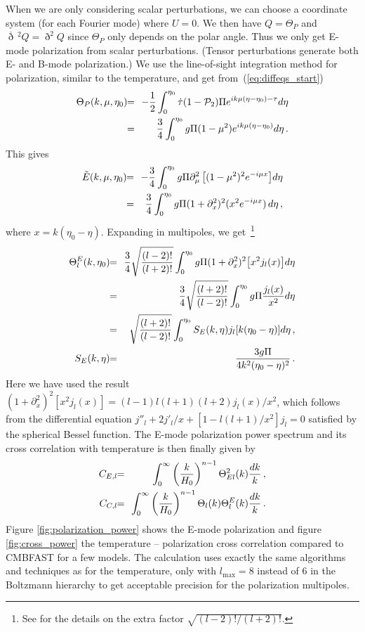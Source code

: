 \documentclass[twocolumn,nofootinbib,amsmath,amssymb]{revtex4}
\newcommand{\ba}{\begin{eqnarray}}
\newcommand{\ea}{\end{eqnarray}}
\newcommand{\hs}{\hspace{-1.12mm}}
\newcommand{\eq}{\hs & = & \hs}
\begin{document}
When we are only considering scalar perturbations, we can choose a coordinate
system (for each Fourier mode) where $U = 0$. We then have $Q = \Theta_P$ and
$\overline{\eth} {}^{\:\! 2} Q = \eth^2 Q$ since $\Theta_P$ only depends on the
polar angle. Thus we only get E-mode polarization from scalar perturbations.
(Tensor perturbations generate both E- and B-mode polarization.) We use the
line-of-sight integration method for polarization, similar to the temperature,
and get from~(\ref{eq:diffeqs_start})
\ba
  \Theta_P(k,\mu,\eta_0) \eq -\frac{1}{2} \int_0^{\eta_0} \dot{\tau}
    (1 - {\cal P}_2) \Pi e^{ik\mu(\eta-\eta_0) - \tau} d\eta \nonumber \\
  \eq \frac{3}{4} \int_0^{\eta_0} g \Pi (1-\mu^2)
    e^{ik\mu(\eta-\eta_0)} d\eta \, .
\ea
This gives~\cite{Zald_Seljak}
\ba
  \tilde{E}(k,\mu,\eta_0) \eq -\frac{3}{4} \int_0^{\eta_0} g \Pi
    \partial_\mu^2 \left[ (1-\mu^2)^2 e^{-i\mu x} \right] \!d\eta \nonumber \\
  \eq \frac{3}{4} \int_0^{\eta_0} g \Pi
    (1 + \partial_x^2)^2 (x^2 e^{-i\mu x}) \, d\eta \, ,
\ea
where $x = k(\eta_0 - \eta)$. Expanding in multipoles, we get~\footnote{See
\cite{Zald_Seljak} for the details on the extra factor $\sqrt{(l-2)! /
(l+2)!}$.}
\ba
  \Theta^E_l(k,\eta_0) \eq \frac{3}{4} \sqrt{\frac{(l-2)!}{(l+2)!}}
    \int_0^{\eta_0} g \Pi (1 + \partial_x^2)^2
    \!\left[ x^2 j_l(x) \right]\! d\eta \nonumber \\
  \eq \frac{3}{4} \sqrt{\frac{(l+2)!}{(l-2)!}} \int_0^{\eta_0} g \Pi
    \frac{j_l(x)}{x^2} d\eta \nonumber \\
  \eq \sqrt{\frac{(l+2)!}{(l-2)!}} \int_0^{\eta_0}
    S_E(k,\eta) j_l[k(\eta_0-\eta)] d\eta \, , \nonumber \\
  S_E(k,\eta) \eq \frac{3g\Pi}{4k^2(\eta_0-\eta)^2} \, .
\ea
Here we have used the result $(1 + \partial_x^2)^2 \!\left[ x^2 j_l(x)
\right]\! = (l-1)l(l+1)(l+2) j_l(x) / x^2$, which follows from the differential
equation $j''_l + 2 j'_l / x + \!\left[ 1 - l(l+1)/x^2 \right]\! j_l = 0$
satisfied by the spherical Bessel function. The E-mode polarization power
spectrum and its cross correlation with temperature is then finally given
by~\cite{Zald_Seljak}
\ba
  C_{E,l} \eq \int_0^\infty \left( \frac{k}{H_0} \right)^{n-1}
    \Theta_{El}^2(k) \frac{dk}{k} \, , \nonumber \\
  C_{C,l} \eq \int_0^\infty \left( \frac{k}{H_0} \right)^{n-1}
    \Theta_l(k) \Theta^E_l(k) \frac{dk}{k} \, .
  \label{eq:polpower_E}
\ea
Figure \ref{fig:polarization_power} shows the E-mode polarization and figure
\ref{fig:cross_power} the temperature -- polarization cross correlation
compared to CMBFAST for a few models. The calculation uses exactly the same
algorithms and techniques as for the temperature, only with $l_{\max} = 8$
instead of $6$ in the Boltzmann hierarchy to get acceptable precision for the
polarization multipoles.
\end{document}
